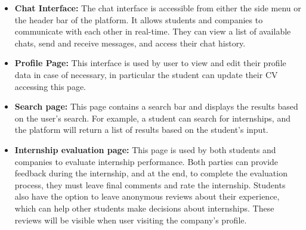 \begin{itemize}
    \item \textbf{Chat Interface:} The chat interface is accessible from either the side menu or the header bar of the platform. It allows 
    students and companies to communicate with each other in real-time. They can view a list of available chats, send and receive messages, 
    and access their chat history.

    \item \textbf{Profile Page:} This interface is used by user to view and edit their profile data in case of necessary, in particular
    the student can update their CV accessing this page.

    \item \textbf{Search page:} This page contains a search bar and displays the results based on the user's search. For example, a student
    can search for internships, and the platform will return a list of results based on the student's input. 
    
    \item \textbf{Internship evaluation page:} This page is used by both students and companies to evaluate internship performance. Both 
    parties can provide feedback during the internship, and at the end, to complete the evaluation process, they must leave final comments 
    and rate the internship. Students also have the option to leave anonymous reviews about their experience, which can help other students
    make decisions about internships. These reviews will be visible when user visiting the company's profile.

\end{itemize}

